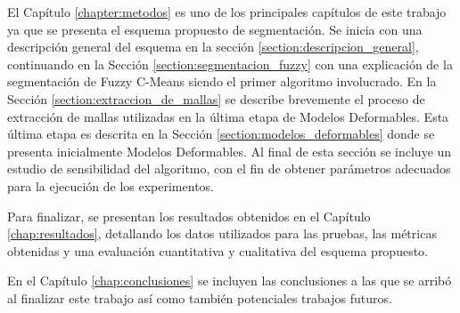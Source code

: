 El Capítulo \ref{chapter:metodos} es uno de los principales capítulos de este trabajo ya que se presenta el esquema propuesto de segmentación. Se inicia con una descripción general del esquema en la sección \ref{section:descripcion_general},  continuando en la Sección \ref{section:segmentacion_fuzzy} con una explicación de la segmentación de Fuzzy C-Means siendo el primer algoritmo involucrado. En la Sección \ref{section:extraccion_de_mallas} se describe brevemente el proceso de extracción de mallas utilizadas en la última etapa de Modelos Deformables. Esta última etapa es descrita en la Sección \ref{section:modelos_deformables} donde se presenta inicialmente Modelos Deformables. Al final de esta sección se incluye un estudio de sensibilidad del algoritmo, con el fin de obtener parámetros adecuados para la ejecución de los experimentos.

Para finalizar, se presentan los resultados obtenidos en el Capítulo \ref{chap:resultados}, detallando los datos utilizados para las pruebas, las métricas obtenidas y una evaluación cuantitativa y cualitativa del esquema propuesto.

En el Capítulo \ref{chap:conclusiones} se incluyen las conclusiones a las que se arribó al finalizar este trabajo así como también potenciales trabajos futuros.